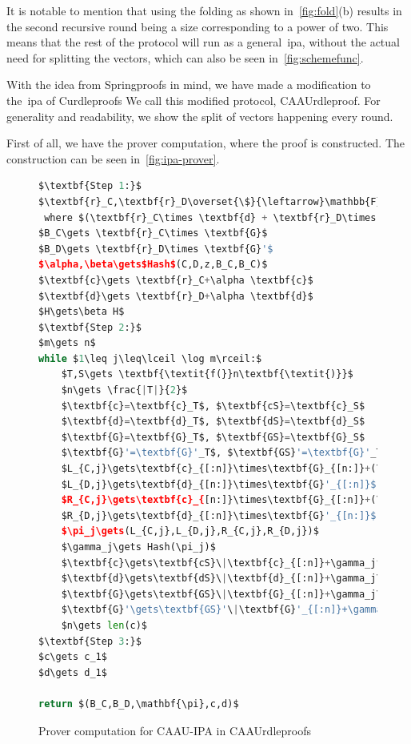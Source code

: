 It is notable to mention that using the folding as shown in~\autoref{fig:fold}(b) results in the second recursive round being a size corresponding to a power of two.
This means that the rest of the protocol will run as a general~\gls{ipa}, without the actual need for splitting the vectors, which can also be seen in~\autoref{fig:schemefunc}.

With the idea from Springproofs in mind, we have made a modification to the~\gls{ipa} of Curdleproofs
We call this modified protocol, CAAUrdleproof.
For generality and readability, we show the split of vectors happening every round.

First of all, we have the prover computation, where the proof is constructed.
The construction can be seen in~\autoref{fig:ipa-prover}.

\begin{figure}[ht]
\begin{framed}
    \begin{lstlisting}[language=Python,mathescape=true,label={lst:ipa-prover}]
$\textbf{Step 1:}$
$\textbf{r}_C,\textbf{r}_D\overset{\$}{\leftarrow}\mathbb{F}^n$
 where $(\textbf{r}_C\times \textbf{d} + \textbf{r}_D\times \textbf{c})=0\text{ and }\textbf{r}_C\times \textbf{r}_D=0$
$B_C\gets \textbf{r}_C\times \textbf{G}$
$B_D\gets \textbf{r}_D\times \textbf{G}'$
$\alpha,\beta\gets$Hash$(C,D,z,B_C,B_C)$
$\textbf{c}\gets \textbf{r}_C+\alpha \textbf{c}$
$\textbf{d}\gets \textbf{r}_D+\alpha \textbf{d}$
$H\gets\beta H$
$\textbf{Step 2:}$
$m\gets n$
while $1\leq j\leq\lceil \log m\rceil:$
    $T,S\gets \textbf{\textit{f(}}n\textbf{\textit{)}}$
    $n\gets \frac{|T|}{2}$
    $\textbf{c}=\textbf{c}_T$, $\textbf{cS}=\textbf{c}_S$
    $\textbf{d}=\textbf{d}_T$, $\textbf{dS}=\textbf{d}_S$
    $\textbf{G}=\textbf{G}_T$, $\textbf{GS}=\textbf{G}_S$
    $\textbf{G}'=\textbf{G}'_T$, $\textbf{GS}'=\textbf{G}'_T$
    $L_{C,j}\gets\textbf{c}_{[:n]}\times\textbf{G}_{[n:]}+(\textbf{c}_{[:n]}\times\textbf{d}_{[n:]})H$
    $L_{D,j}\gets\textbf{d}_{[n:]}\times\textbf{G}'_{[:n]}$
    $R_{C,j}\gets\textbf{c}_{[n:]}\times\textbf{G}_{[:n]}+(\textbf{c}_{[n:]}\times\textbf{d}_{[:n]})H$
    $R_{D,j}\gets\textbf{d}_{[:n]}\times\textbf{G}'_{[n:]}$
    $\pi_j\gets(L_{C,j},L_{D,j},R_{C,j},R_{D,j})$
    $\gamma_j\gets Hash(\pi_j)$
    $\textbf{c}\gets\textbf{cS}\|\textbf{c}_{[:n]}+\gamma_j^{-1}\textbf{c}_{[n:]}$
    $\textbf{d}\gets\textbf{dS}\|\textbf{d}_{[:n]}+\gamma_j\textbf{d}_{[n:]}$
    $\textbf{G}\gets\textbf{GS}\|\textbf{G}_{[:n]}+\gamma_j\textbf{G}_{[n:]}$
    $\textbf{G}'\gets\textbf{GS}'\|\textbf{G}'_{[:n]}+\gamma_j^{-1}\textbf{G}'_{[n:]}$
    $n\gets len(c)$
$\textbf{Step 3:}$
$c\gets c_1$
$d\gets d_1$

return $(B_C,B_D,\mathbf{\pi},c,d)$
    \end{lstlisting}
\end{framed}
\caption{Prover computation for CAAU-IPA in CAAUrdleproofs}
\label{fig:ipa-prover}
\end{figure}

